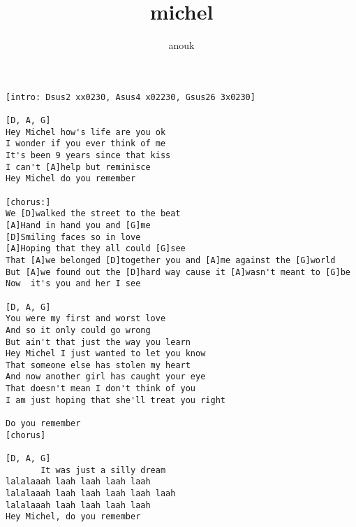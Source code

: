 \author{anouk}
\title{michel}
\maketitle
\begin{verbatim}
[intro: Dsus2 xx0230, Asus4 x02230, Gsus26 3x0230]

[D, A, G]
Hey Michel how's life are you ok
I wonder if you ever think of me
It's been 9 years since that kiss
I can't [A]help but reminisce
Hey Michel do you remember

[chorus:]
We [D]walked the street to the beat
[A]Hand in hand you and [G]me
[D]Smiling faces so in love
[A]Hoping that they all could [G]see
That [A]we belonged [D]together you and [A]me against the [G]world
But [A]we found out the [D]hard way cause it [A]wasn't meant to [G]be
Now  it's you and her I see

[D, A, G]
You were my first and worst love
And so it only could go wrong
But ain't that just the way you learn
Hey Michel I just wanted to let you know
That someone else has stolen my heart
And now another girl has caught your eye
That doesn't mean I don't think of you
I am just hoping that she'll treat you right

Do you remember
[chorus]

[D, A, G]
       It was just a silly dream
lalalaaah laah laah laah laah
lalalaaah laah laah laah laah laah
lalalaaah laah laah laah laah
Hey Michel, do you remember
\end{verbatim}